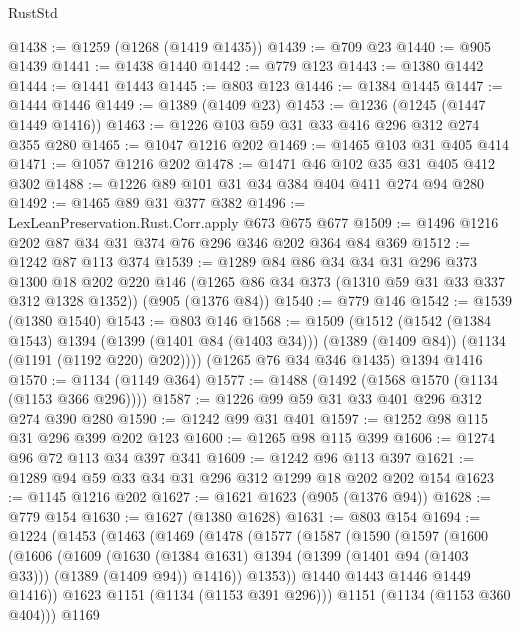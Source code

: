 \begin{lexlean}{RustStd}
\begin{coremodule}
{\begin{coremodule}
{{{{{{{{{@1438 := @1259 (@1268 (@1419 @1435))
@1439 := @709 @23
@1440 := @905 @1439
@1441 := @1438 @1440
@1442 := @779 @123
@1443 := @1380 @1442
@1444 := @1441 @1443
@1445 := @803 @123
@1446 := @1384 @1445
@1447 := @1444 @1446
@1449 := @1389 (@1409 @23)
@1453 := @1236 (@1245 (@1447 @1449 @1416))
@1463 := @1226 @103 @59 @31 @33 @416 @296 @312 @274 @355 @280
@1465 := @1047 @1216 @202
@1469 := @1465 @103 @31 @405 @414
@1471 := @1057 @1216 @202
@1478 := @1471 @46 @102 @35 @31 @405 @412 @302
@1488 := @1226 @89 @101 @31 @34 @384 @404 @411 @274 @94 @280
@1492 := @1465 @89 @31 @377 @382
@1496 := LexLeanPreservation.Rust.Corr.apply @673 @675 @677
@1509 := @1496 @1216 @202 @87 @34 @31 @374 @76 @296 @346 @202 @364 @84 @369
@1512 := @1242 @87 @113 @374
@1539 := @1289
    @84
    @86
    @34
    @34
    @31
    @296
    @373
    @1300
    @18
    @202
    @220
    @146
    (@1265 @86 @34 @373 (@1310 @59 @31 @33 @337 @312 @1328 @1352))
    (@905 (@1376 @84))
@1540 := @779 @146
@1542 := @1539 (@1380 @1540)
@1543 := @803 @146
@1568 := @1509
    (@1512
      (@1542
        (@1384 @1543)
        @1394
        (@1399 (@1401 @84 (@1403 @34)))
        (@1389 (@1409 @84))
        (@1134 (@1191 (@1192 @220) @202))))
    (@1265 @76 @34 @346 @1435)
    @1394
    @1416
@1570 := @1134 (@1149 @364)
@1577 := @1488 (@1492 (@1568 @1570 (@1134 (@1153 @366 @296))))
@1587 := @1226 @99 @59 @31 @33 @401 @296 @312 @274 @390 @280
@1590 := @1242 @99 @31 @401
@1597 := @1252 @98 @115 @31 @296 @399 @202 @123
@1600 := @1265 @98 @115 @399
@1606 := @1274 @96 @72 @113 @34 @397 @341
@1609 := @1242 @96 @113 @397
@1621 := @1289 @94 @59 @33 @34 @31 @296 @312 @1299 @18 @202 @202 @154
@1623 := @1145 @1216 @202
@1627 := @1621 @1623 (@905 (@1376 @94))
@1628 := @779 @154
@1630 := @1627 (@1380 @1628)
@1631 := @803 @154
@1694 := @1224
    (@1453
      (@1463
        (@1469
          (@1478
            (@1577
              (@1587
                (@1590
                  (@1597
                    (@1600
                      (@1606
                        (@1609
                          (@1630
                            (@1384 @1631)
                            @1394
                            (@1399 (@1401 @94 (@1403 @33)))
                            (@1389 (@1409 @94))
                            @1416))
                        @1353))
                    @1440
                    @1443
                    @1446
                    @1449
                    @1416))
                @1623
                @1151
                (@1134 (@1153 @391 @296)))
              @1151
              (@1134 (@1153 @360 @404)))
            @1169
}}}}}}}}}
\end{coremodule}}
\end{coremodule}
\end{lexlean}
